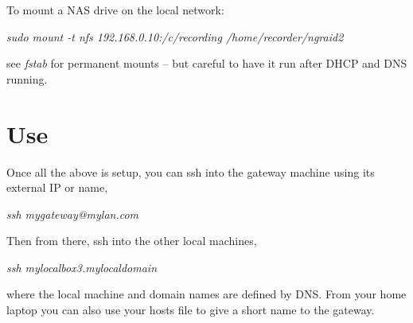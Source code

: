 \documentclass[oneside,english]{scrbook}
\begin{document}
To mount a NAS drive on the local network:

\emph{sudo mount -t nfs 192.168.0.10:/c/recording /home/recorder/ngraid2 }

see \emph{fstab} for permanent mounts -- but careful to have it run
after DHCP and DNS running.

\section{Use}

Once all the above is setup, you can ssh into the gateway machine
using its external IP or name,

\emph{ssh mygateway@mylan.com}

Then from there, ssh into the other local machines,

\emph{ssh mylocalbox3.mylocaldomain}

where the local machine and domain names are defined by DNS. From
your home laptop you can also use your hosts file to give a short
name to the gateway.
\end{document}
